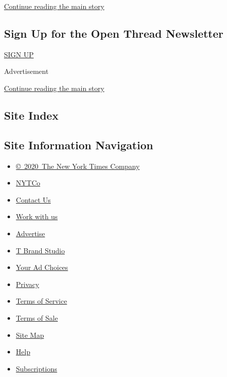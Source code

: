 \protect\hyperlink{after-mid2}{Continue reading the main story}

\hypertarget{sign-up-for-the-open-thread-newsletter}{%
\subsection{Sign Up for the Open Thread
Newsletter}\label{sign-up-for-the-open-thread-newsletter}}

\href{/newsletters/signup/TZ}{SIGN UP}

Advertisement

\protect\hyperlink{after-mktg}{Continue reading the main story}

\hypertarget{site-index}{%
\subsection{Site Index}\label{site-index}}

\hypertarget{site-information-navigation}{%
\subsection{Site Information
Navigation}\label{site-information-navigation}}

\begin{itemize}
\tightlist
\item
  \href{https://help.nytimes.com/hc/en-us/articles/115014792127-Copyright-notice}{©~2020~The
  New York Times Company}
\end{itemize}

\begin{itemize}
\tightlist
\item
  \href{https://www.nytco.com/}{NYTCo}
\item
  \href{https://help.nytimes.com/hc/en-us/articles/115015385887-Contact-Us}{Contact
  Us}
\item
  \href{https://www.nytco.com/careers/}{Work with us}
\item
  \href{https://nytmediakit.com/}{Advertise}
\item
  \href{http://www.tbrandstudio.com/}{T Brand Studio}
\item
  \href{https://www.nytimes.com/privacy/cookie-policy\#how-do-i-manage-trackers}{Your
  Ad Choices}
\item
  \href{https://www.nytimes.com/privacy}{Privacy}
\item
  \href{https://help.nytimes.com/hc/en-us/articles/115014893428-Terms-of-service}{Terms
  of Service}
\item
  \href{https://help.nytimes.com/hc/en-us/articles/115014893968-Terms-of-sale}{Terms
  of Sale}
\item
  \href{https://spiderbites.nytimes.com}{Site Map}
\item
  \href{https://help.nytimes.com/hc/en-us}{Help}
\item
  \href{https://www.nytimes.com/subscription?campaignId=37WXW}{Subscriptions}
\end{itemize}
